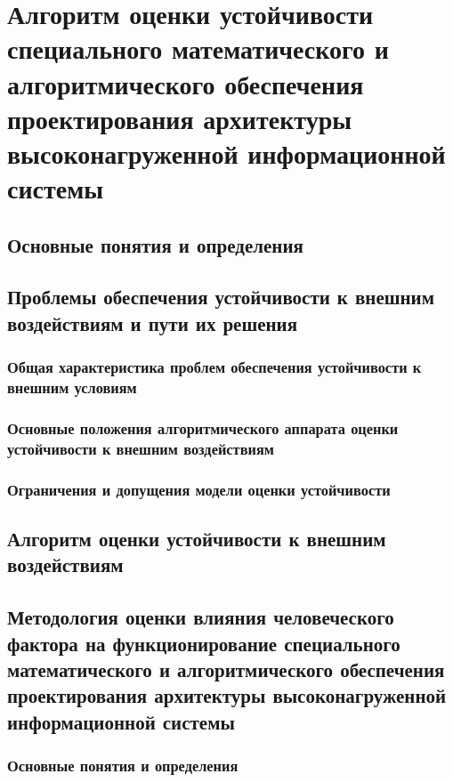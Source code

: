 \chapter{Алгоритм оценки устойчивости специального математического и алгоритмического обеспечения проектирования архитектуры высоконагруженной информационной системы}\label{ch:ch6}

\section{Основные понятия и определения}\label{sec:ch6/sect1}
\section{Проблемы обеспечения устойчивости к внешним воздействиям и пути их решения}\label{sec:ch6/sect2}

\subsection{Общая характеристика проблем обеспечения устойчивости к внешним условиям}\label{subsec:ch6/sect2/sub1}
\subsection{Основные положения алгоритмического аппарата оценки устойчивости к внешним воздействиям}\label{subsec:ch6/sect2/sub2}
\subsection{Ограничения и допущения модели оценки устойчивости}\label{subsec:ch6/sect2/sub3}

\section{Алгоритм оценки устойчивости к внешним воздействиям}\label{sec:ch6/sect3}
\section{Методология оценки влияния человеческого фактора на функционирование специального математического и алгоритмического обеспечения проектирования архитектуры высоконагруженной информационной системы}\label{sec:ch6/sect4}
\subsection{Основные понятия и определения}\label{subsec:ch6/sect4/sub1}
